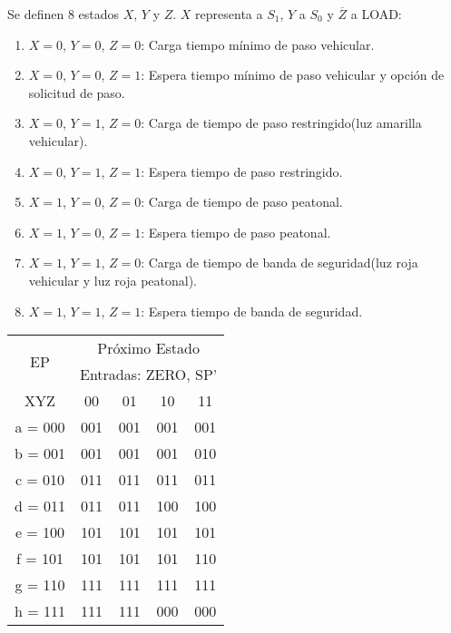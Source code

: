 Se definen 8 estados $X$, $Y$ y $Z$. $X$ representa a $S_1$, $Y$ a $S_0$ y
$\overline{Z}$ a LOAD:
\begin{enumerate}[label*=\textbf{\alph*)}]
  \item $X=0$, $Y=0$, $Z=0$: Carga tiempo mínimo de paso vehicular.
  \item $X=0$, $Y=0$, $Z=1$: Espera tiempo mínimo de paso vehicular y opción de solicitud de paso.
  \item $X=0$, $Y=1$, $Z=0$: Carga de tiempo de paso restringido(luz amarilla vehicular).
  \item $X=0$, $Y=1$, $Z=1$: Espera tiempo de paso restringido.
  \item $X=1$, $Y=0$, $Z=0$: Carga de tiempo de paso peatonal.
  \item $X=1$, $Y=0$, $Z=1$: Espera tiempo de paso peatonal.
  \item $X=1$, $Y=1$, $Z=0$: Carga de tiempo de banda de seguridad(luz roja vehicular y luz roja peatonal).
  \item $X=1$, $Y=1$, $Z=1$: Espera tiempo de banda de seguridad.
\end{enumerate}


\begin{table}[H]
  \centering
  \begin{tabular}{c c c c c}
    \toprule
    \multirow{2}{*}{EP}  & \multicolumn{4}{c}{Próximo Estado} \\
    & \multicolumn{4}{c}{Entradas: ZERO, SP'} \\  \cmidrule{2-5}
    XYZ & 00 & 01 & 10 & 11\\ \toprule
    a = 000 & 001 & 001 & 001 & 001\\ \midrule
    b = 001 & 001 & 001 & 001 & 010\\ \midrule
    c = 010 & 011 & 011 & 011 & 011\\ \midrule
    d = 011 & 011 & 011 & 100 & 100\\ \midrule
    e = 100 & 101 & 101 & 101 & 101\\ \midrule
    f = 101 & 101 & 101 & 101 & 110\\ \midrule
    g = 110 & 111 & 111 & 111 & 111\\ \midrule
    h = 111 & 111 & 111 & 000 & 000\\ \bottomrule
  \end{tabular}
\end{table}

